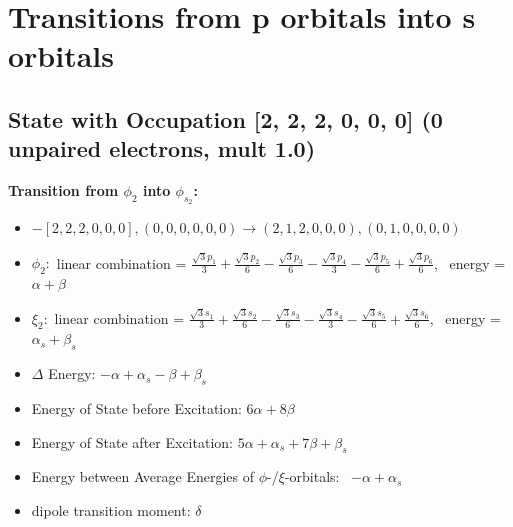 \documentclass[12pt,a4paper]{article}
\begin{document}
\newpage \section*{Transitions from p orbitals into s orbitals}\subsection*{State with Occupation [2, 2, 2, 0, 0, 0] (0 unpaired electrons, mult 1.0)}
        \noindent\textbf{Transition from $\phi_{2}$ into $\phi_{s_{2}}$:}
        \begin{itemize}
            \item $- [2, 2, 2, 0, 0, 0], (0, 0, 0, 0, 0, 0) \rightarrow (2, 1, 2, 0, 0, 0), (0, 1, 0, 0, 0, 0)$
        
            \item $\phi_{2}:$ linear combination = $\frac{\sqrt{3} p_{1}}{3} + \frac{\sqrt{3} p_{2}}{6} - \frac{\sqrt{3} p_{3}}{6} - \frac{\sqrt{3} p_{4}}{3} - \frac{\sqrt{3} p_{5}}{6} + \frac{\sqrt{3} p_{6}}{6}$, \
            energy = $\alpha + \beta$
            
            \item $\xi_{2}:$ linear combination = $\frac{\sqrt{3} s_{1}}{3} + \frac{\sqrt{3} s_{2}}{6} - \frac{\sqrt{3} s_{3}}{6} - \frac{\sqrt{3} s_{4}}{3} - \frac{\sqrt{3} s_{5}}{6} + \frac{\sqrt{3} s_{6}}{6}$, \
            energy = $\alpha_{s} + \beta_{s}$
            
            \item $\Delta$ Energy: $- \alpha + \alpha_{s} - \beta + \beta_{s}$
            \item Energy of State before Excitation: $6 \alpha + 8 \beta$
            \item Energy of State after Excitation: $5 \alpha + \alpha_{s} + 7 \beta + \beta_{s}$
            \item Energy between Average Energies of $\phi$-/$\xi$-orbitals: \
            $- \alpha + \alpha_{s}$
        
            \item dipole transition moment: $\delta$
        
        \end{itemize}
        
\end{document}
